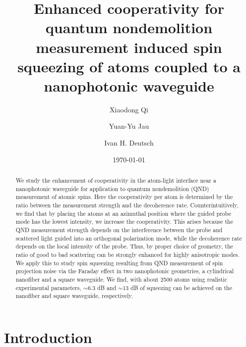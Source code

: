 \documentclass[aps,pra,twocolumn,superscriptaddress]{revtex4-1} %
\begin{document}
\title{Enhanced cooperativity for quantum nondemolition measurement induced spin squeezing of atoms coupled to a nanophotonic waveguide}
\author{Xiaodong Qi}
\author{Yuan-Yu Jau}
\author{Ivan H. Deutsch}
\date{\today}

\begin{abstract}
We study the enhancement of cooperativity in the atom-light interface near a nanophotonic waveguide for application to quantum nondemolition (QND) measurement of atomic spins.  Here the cooperativity per atom is determined by the ratio between the  measurement strength and the decoherence rate.  Counterintuitively, we find that by placing the atoms at an azimuthal position where the guided probe mode has the lowest intensity, we increase the cooperativity.  This arises because the QND measurement strength depends on the interference between the probe and scattered light guided into an orthogonal polarization mode, while the decoherence rate depends on the local intensity of the probe.  Thus, by proper choice of geometry, the ratio of good to bad scattering can be strongly enhanced for highly anisotropic modes. We apply this to study spin squeezing resulting from QND measurement of spin projection noise via the Faraday effect in two nanophotonic geometries, a cylindrical nanofiber and a square waveguide.  We find, with about 2500 atoms using realistic experimental parameters, $ \sim 6.3 $ dB and $ \sim 13 $ dB of squeezing can be achieved on the nanofiber and square waveguide, respectively. 
\end{abstract}

\maketitle

\section{Introduction}
\end{document}
